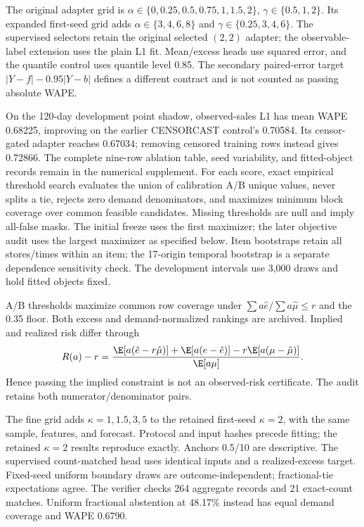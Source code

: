 The original adapter grid is $\alpha\in\{0,0.25,0.5,0.75,1,1.5,2\}$, $\gamma\in\{0.5,1,2\}$. Its expanded first-seed grid adds $\alpha\in\{3,4,6,8\}$ and $\gamma\in\{0.25,3,4,6\}$. The supervised selectors retain the original selected $(2,2)$ adapter; the observable-label extension uses the plain L1 fit. Mean/excess heads use squared error, and the quantile control uses quantile level 0.85. The secondary paired-error target $|Y-f|-0.95|Y-b|$ defines a different contract and is not counted as passing absolute WAPE.

On the 120-day development point shadow, observed-sales L1 has mean WAPE 0.68225, improving on the earlier CENSORCAST control's 0.70584. Its censor-gated adapter reaches 0.67034; removing censored training rows instead gives 0.72866. The complete nine-row ablation table, seed variability, and fitted-object records remain in the numerical supplement.
For each score, exact empirical threshold search evaluates the union of calibration A/B unique values, never splits a tie, rejects zero demand denominators, and maximizes minimum block coverage over common feasible candidates. Missing thresholds are null and imply all-false masks. The initial freeze uses the first maximizer; the later objective audit uses the largest maximizer as specified below. Item bootstraps retain all stores/times within an item; the 17-origin temporal bootstrap is a separate dependence sensitivity check. The development intervals use 3,000 draws and hold fitted objects fixed.


A/B thresholds maximize common row coverage under $\sum a\hat e/\sum a\hat\mu\leq r$ and the 0.35 floor. Both excess and demand-normalized rankings are archived. Implied and realized risk differ through
\[
 R(a)-r=\frac{\E[a(\hat e-r\hat\mu)]+\E[a(e-\hat e)]-r\E[a(\mu-\hat\mu)]}{\E[a\mu]}.
\]
Hence passing the implied constraint is not an observed-risk certificate. The audit retains both numerator/denominator pairs.

The fine grid adds $\kappa=1,1.5,3,5$ to the retained first-seed $\kappa=2$, with the same sample, features, and forecast. Protocol and input hashes precede fitting; the retained $\kappa=2$ results reproduce exactly. Anchors 0.5/10 are descriptive.
The supervised count-matched head uses identical inputs and a realized-excess target. Fixed-seed uniform boundary draws are outcome-independent; fractional-tie expectations agree. The verifier checks 264 aggregate records and 21 exact-count matches. Uniform fractional abstention at 48.17\% instead has equal demand coverage and WAPE 0.6790.
